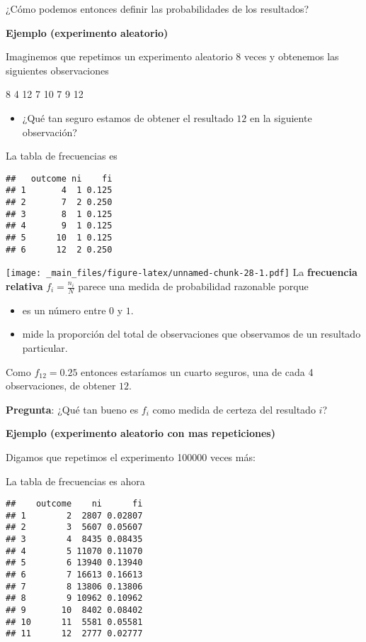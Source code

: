 \documentclass[
]{book}
\providecommand{\tightlist}{%
  \setlength{\itemsep}{0pt}\setlength{\parskip}{0pt}}
\begin{document}
¿Cómo podemos entonces definir las probabilidades de los resultados?

\textbf{Ejemplo (experimento aleatorio)}

Imaginemos que repetimos un experimento aleatorio \(8\) veces y obtenemos las siguientes observaciones

8 4 12 7 10 7 9 12

\begin{itemize}
\tightlist
\item
  ¿Qué tan seguro estamos de obtener el resultado \(12\) en la siguiente observación?
\end{itemize}

La tabla de frecuencias es

\begin{verbatim}
##   outcome ni    fi
## 1       4  1 0.125
## 2       7  2 0.250
## 3       8  1 0.125
## 4       9  1 0.125
## 5      10  1 0.125
## 6      12  2 0.250
\end{verbatim}

\texttt{[image: \_main\_files/figure-latex/unnamed-chunk-28-1.pdf]}
La \textbf{frecuencia relativa} \(f_i=\frac{n_i}{N}\) parece una medida de probabilidad razonable porque

\begin{itemize}
\tightlist
\item
  es un número entre \(0\) y \(1\).
\item
  mide la proporción del total de observaciones que observamos de un resultado particular.
\end{itemize}

Como \(f_{12}=0.25\) entonces estaríamos un cuarto seguros, una de cada 4 observaciones, de obtener \(12\).

\textbf{Pregunta}: ¿Qué tan bueno es \(f_i\) como medida de certeza del resultado \(i\)?

\textbf{Ejemplo (experimento aleatorio con mas repeticiones)}

Digamos que repetimos el experimento 100000 veces más:

La tabla de frecuencias es ahora

\begin{verbatim}
##    outcome    ni      fi
## 1        2  2807 0.02807
## 2        3  5607 0.05607
## 3        4  8435 0.08435
## 4        5 11070 0.11070
## 5        6 13940 0.13940
## 6        7 16613 0.16613
## 7        8 13806 0.13806
## 8        9 10962 0.10962
## 9       10  8402 0.08402
## 10      11  5581 0.05581
## 11      12  2777 0.02777
\end{verbatim}
\end{document}
